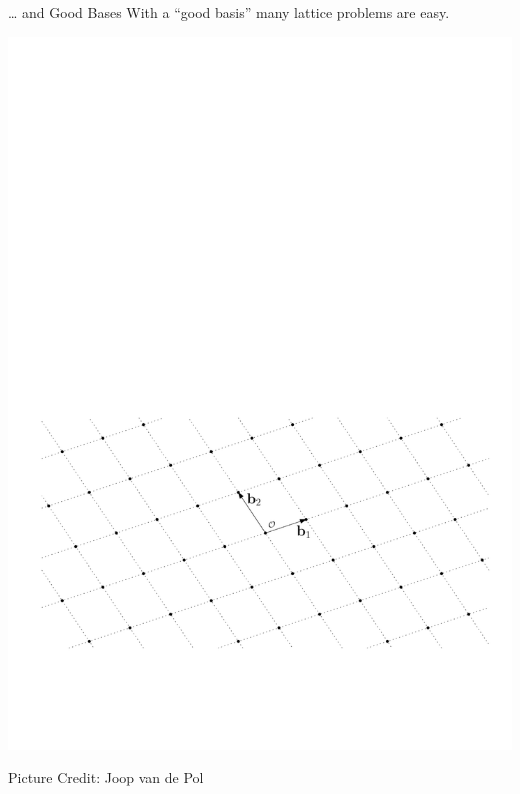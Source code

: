 \documentclass[xcolor=table,10pt,aspectratio=169]{beamer}
\begin{document}
\begin{frame}[label={sec:org158f189}]{… and Good Bases}
With a “good basis” many lattice problems are easy.

\begin{center}
\includegraphics[width=0.8\linewidth]{./joop-latt1.pdf}
\end{center}

\tiny Picture Credit: Joop van de Pol
\end{frame}
\end{document}
